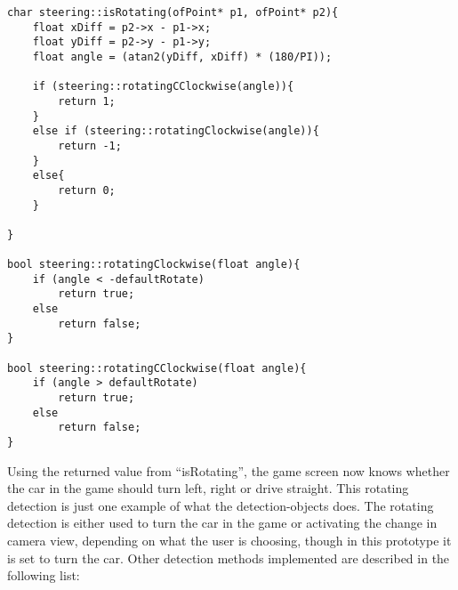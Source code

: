 \pagebreak[4]

\begin{lstlisting}[caption=update, label=lst:lst10]
char steering::isRotating(ofPoint* p1, ofPoint* p2){
	float xDiff = p2->x - p1->x;
	float yDiff = p2->y - p1->y;
	float angle = (atan2(yDiff, xDiff) * (180/PI));

	if (steering::rotatingCClockwise(angle)){
		return 1;
	}
	else if (steering::rotatingClockwise(angle)){
		return -1;
	}
	else{
		return 0;
	}

}

bool steering::rotatingClockwise(float angle){
	if (angle < -defaultRotate)
		return true;
	else
		return false;
}

bool steering::rotatingCClockwise(float angle){
	if (angle > defaultRotate)
		return true;
	else
		return false;
}
\end{lstlisting}

Using the returned value from “isRotating”, the game screen now knows whether the car in the game should turn left, right or drive straight. 
This rotating detection is just one example of what the detection-objects does. 
The rotating detection is either used to turn the car in the game or activating the change in camera view, depending on what the user is choosing, though in this prototype it is set to turn the car. 
Other detection methods implemented are described in the following list:

